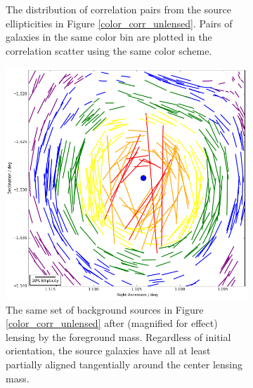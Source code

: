 \documentclass[%
 reprint,
 amsmath,amssymb,
 aps,nofootinbib
]{revtex4-1}
\begin{document}
\begin{figure}
\begin{subfigure}{0.425\textwidth}
        \captionsetup{justification=raggedright,singlelinecheck=false}
        \caption{The distribution of correlation pairs from the source ellipticities in Figure \ref{color_corr_unlensed}. Pairs of galaxies in the same color bin are plotted in the correlation scatter using the same color scheme.}
        \label{corr_dist_unlensed}
    \end{subfigure}

    \begin{subfigure}{0.425\textwidth}
        \includegraphics[width=\textwidth]{figs-swe/corr_visualization_lensed.png}
        \captionsetup{justification=raggedright,singlelinecheck=false}
        \caption{The same set of background sources in Figure \ref{color_corr_unlensed} after (magnified for effect) lensing by the foreground mass. Regardless of initial orientation, the source galaxies have all at least partially aligned tangentially around the center lensing mass.}
        \label{color_corr_lensed}
    \end{subfigure}
    ~
    \begin{subfigure}{0.425\textwidth}

\end{subfigure}
\end{figure}
\end{document}
